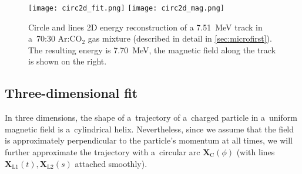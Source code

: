 			\begin{figure}
				\centering
				\texttt{[image: circ2d\_fit.png]}
				\hfill
				\texttt{[image: circ2d\_mag.png]}
				\caption{Circle and lines 2D energy reconstruction of a \qty{7.51}{\MeV} track in a~70:30 Ar:CO$_2$ gas mixture (described in detail in \cref{sec:microfirst}). The resulting energy is \qty{7.70}{\MeV}, the magnetic field along the track is shown on the right.}
				\label{fig:circle2d}
			\end{figure}
		
		\subsection{Three-dimensional fit}
			In three dimensions, the shape of a~trajectory of a~charged particle in a~uniform magnetic field is a~cylindrical helix. Nevertheless, since we assume that the field is approximately perpendicular to the particle's momentum at all times, we will further approximate the trajectory with a~circular arc $\mathbf{X}_\text{C}(\phi)$ (with lines $\mathbf{X}_\text{L1}(t),\mathbf{X}_\text{L2}(s)$ attached smoothly).
			
